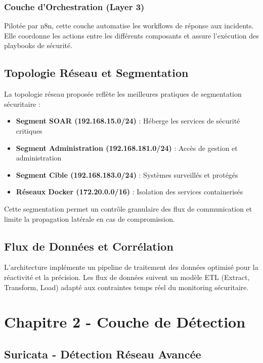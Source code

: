 \subsubsection{Couche d'Orchestration (Layer 3)}
Pilotée par n8n, cette couche automatise les workflows de réponse aux incidents. Elle coordonne les actions entre les différents composants et assure l'exécution des playbooks de sécurité.

\subsection{Topologie Réseau et Segmentation}

La topologie réseau proposée reflète les meilleures pratiques de segmentation sécuritaire :

\begin{itemize}
    \item \textbf{Segment SOAR (192.168.15.0/24)} : Héberge les services de sécurité critiques
    \item \textbf{Segment Administration (192.168.181.0/24)} : Accès de gestion et administration
    \item \textbf{Segment Cible (192.168.183.0/24)} : Systèmes surveillés et protégés
    \item \textbf{Réseaux Docker (172.20.0.0/16)} : Isolation des services containerisés
\end{itemize}

Cette segmentation permet un contrôle granulaire des flux de communication et limite la propagation latérale en cas de compromission.

\subsection{Flux de Données et Corrélation}

L'architecture implémente un pipeline de traitement des données optimisé pour la réactivité et la précision. Les flux de données suivent un modèle ETL (Extract, Transform, Load) adapté aux contraintes temps réel du monitoring sécuritaire.

\section{Chapitre 2 - Couche de Détection}

\subsection{Suricata - Détection Réseau Avancée}

